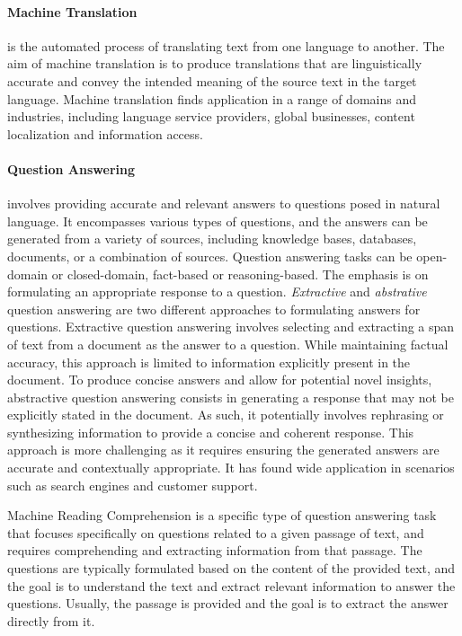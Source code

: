 \paragraph{Machine Translation} is the automated process of translating text from one language to another. The aim of machine translation is to produce translations that are linguistically accurate and convey the intended meaning of the source text in the target language. Machine translation finds application in a range of domains and industries, including language service providers, global businesses, content localization and information access. 

\paragraph{Question Answering} involves providing accurate and relevant answers to questions posed in natural language. It encompasses various types of questions, and the answers can be generated from a variety of sources, including knowledge bases, databases, documents, or a combination of sources. Question answering tasks can be open-domain or closed-domain, fact-based or reasoning-based. The emphasis is on formulating an appropriate response to a question. \textit{Extractive} and \textit{abstrative} question answering are two different approaches to formulating answers for questions. Extractive question answering involves selecting and extracting a span of text from a document as the answer to a question. While maintaining factual accuracy, this approach is limited to information explicitly present in the document. To produce concise answers and allow for potential novel insights, abstractive question answering consists in generating a response that may not be explicitly stated in the document. As such, it potentially involves rephrasing or synthesizing information to provide a concise and coherent response. This approach is more challenging as it requires ensuring the generated answers are accurate and contextually appropriate. It has found wide application in scenarios such as search engines and customer support.

Machine Reading Comprehension is a specific type of question answering task that focuses specifically on questions related to a given passage of text, and requires comprehending and extracting information from that passage. The questions are typically formulated based on the content of the provided text, and the goal is to understand the text and extract relevant information to answer the questions. Usually, the passage is provided and the goal is to extract the answer directly from it.

